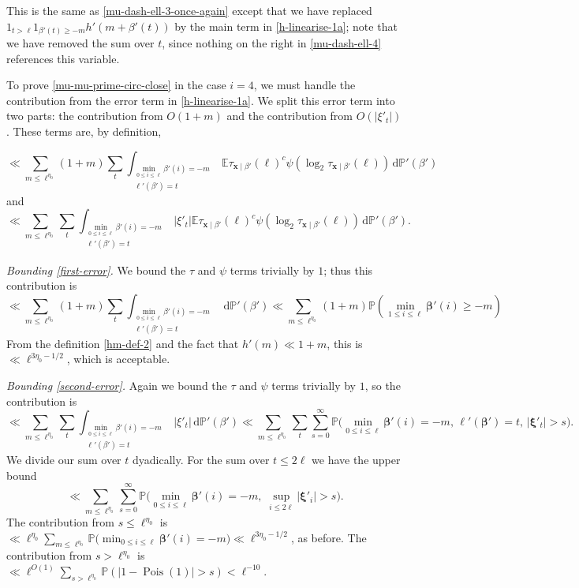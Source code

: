 \documentclass[11pt,reqno]{amsart}
\numberwithin{equation}{section}
\theoremstyle{definition}
\theoremstyle{remark}
\newcommand{\mb}{\mathbb}
\newcommand{\mbf}{\mathbf}
\newcommand\Pois{\operatorname{Pois}}
\def\boldbeta{\boldsymbol\beta}
\def\boldxi{\boldsymbol\xi}
\renewcommand{\le}{\leqslant}
\renewcommand{\ge}{\geqslant}
\begin{document}
This is the same as \cref{mu-dash-ell-3-once-again} except that we have replaced $1_{t > \ell} 1_{\beta'(t) \ge -m} h'(m + \beta'(t))$ by the main term in \cref{h-linearise-1a}; note that we have removed the sum over $t$, since nothing on the right in \cref{mu-dash-ell-4} references this variable.

To prove \cref{mu-mu-prime-circ-close} in the case $i = 4$, we must handle the contribution from the error term in \cref{h-linearise-1a}. We split this error term into two parts: the contribution from $O(1+m)$ and the contribution from $O(|\xi'_{t}|)$. These terms are, by definition, 

\begin{equation}\label{first-error} \ll  \sum_{m \le \ell^{\eta_0}} (1 + m)\sum_{t} \int_{\substack{\min_{0 \le i \le \ell} \beta'(i) = -m \\ \ell'(\beta') = t}}\mb{E} \tau_{\mbf{x} \mid \beta'}(\ell)^c \psi (\log_2 \tau_{\mbf{x} \mid \beta'}(\ell)) \, \mathrm{d}\mb{P}'(\beta')\end{equation}  and
\begin{equation}\label{second-error} \ll  \sum_{m \le \ell^{\eta_0}} \sum_{t} \int_{\substack{\min_{0 \le i \le \ell} \beta'(i) = -m \\ \ell'(\beta') = t}}|\xi'_{t}| \mb{E} \tau_{\mbf{x} \mid \beta'}(\ell)^c \psi (\log_2 \tau_{\mbf{x} \mid \beta'}(\ell)) \, \mathrm{d}\mb{P}'(\beta'). \end{equation}

\emph{Bounding \cref{first-error}.} We bound the $\tau$ and $\psi$ terms trivially by $1$; thus this contribution is
\[ \ll \sum_{m \le \ell^{\eta_0}} (1+m) \sum_{t} \int_{\substack{\min_{0 \le i \le \ell} \beta'(i) = -m \\ \ell'(\beta') = t}} \, \mathrm{d}\mb{P}'(\beta') \ll  \sum_{m \le \ell^{\eta_0}} (1+m) \mb{P}(\min_{1 \le i \le \ell} \boldbeta'(i) \ge -m) \] From the definition \cref{hm-def-2} and the fact that $h'(m) \ll 1 + m$, this is $\ll \ell^{3\eta_0 - 1/2}$, which is acceptable.

\emph{Bounding \cref{second-error}.} Again we bound the $\tau$ and $\psi$ terms trivially by $1$, so the contribution is 
\begin{equation}  \ll\sum_{m \le \ell^{\eta_0}} \sum_{t} \int_{\substack{\min_{0 \le i \le \ell} \beta'(i) = -m \\ \ell'(\beta') = t}}|\xi'_{t}|\, \mathrm{d}\mb{P}'(\beta')   \ll \sum_{m \le \ell^{\eta_0}} \sum_{t} \sum_{s = 0}^{\infty} \mb{P} \big( \min_{0 \le i \le \ell} \boldbeta'(i) = -m, \,\ell'(\boldbeta') = t, \, |\boldxi'_{t}| > s\big). \label{to-ell-dash}\end{equation}
We divide our sum over $t$ dyadically. For the sum over $t \le 2\ell$ we have the upper bound
\[ \ll \sum_{m \le \ell^{\eta_0}} \sum_{s = 0}^{\infty} \mb{P} \big( \min_{0 \le i \le \ell} \boldbeta'(i) = -m,\; \sup_{i \le 2\ell} |\boldxi'_{i}| > s).\] The contribution from $s \le \ell^{\eta_0}$ is $\ll \ell^{\eta_0} \sum_{m \le \ell^{\eta_0}}\mb{P} \big( \min_{0 \le i \le \ell} \boldbeta'(i) = -m) \ll \ell^{3\eta_0 - 1/2}$, as before. The contribution from $s > \ell^{\eta_0}$ is $\ll \ell^{O(1)}\sum_{s > \ell^{\eta_0}} \mb{P}(|1 - \Pois(1)| > s) < \ell^{-10}$.
\end{document}
